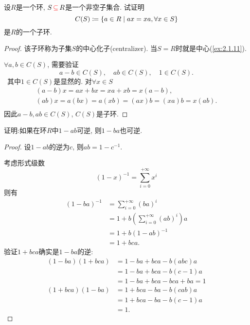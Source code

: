 \begin{problem}\label{ex:1.2.4}
    设$R$是一个环, $S \,\textcolor{red}{\subseteq}\, R$是一个非空子集合. 试证明
\[
    C(S) \mathrel{\coloneqq} \{a \in R \mid ax = xa, \forall x \in S \}
\]
是$R$的一个子环.
\end{problem}

\begin{proof}
    该子环称为子集$S$的中心化子(centralizer). 当$S = R$时就是中心(\ref{ex:2.1.11}).

    $\forall a, b \in C(S)$, 需要验证
    \[
        a - b \in C(S), \quad ab \in C(S), \quad 1 \in C(S).
    \]\
    其中$1 \in C(S)$是显然的.
    对$\forall x \in S$
    \[
    \begin{gathered}
        (a - b)x = ax + bx = xa + xb = x(a - b),\\
        (ab)x = a(bx) = a(xb) = (ax)b = (xa)b = x(ab).\\
    \end{gathered}
    \]
    因此$a - b, ab \in C(S)$, $C(S)$是子环.
\end{proof}

\begin{problem}\label{ex:1.2.5}
    证明:如果在环$R$中$1 - ab$可逆, 则$1 - ba$也可逆.
\end{problem}

\begin{proof}
    设$1 - ab$的逆为$c$, 则$ab = 1 - c^{-1}$.

    考虑形式级数
    \[
        (1 - x)^{-1} = \sum_{i = 0}^{+\infty} x^i
    \]
    则有
    \[
    \begin{aligned}
        (1 - ba)^{-1} &= \sum_{i = 0}^{+\infty} (ba)^i\\
        &= 1 + b\left(\sum_{i = 0}^{+\infty} (ab)^i\right)a\\
        &= 1 + b(1 - ab)^{-1}\\
        &= 1 + bca.
    \end{aligned} 
    \]
    验证$1 + bca$确实是$1 - ba$的逆: 
    \[
    \begin{aligned}
        (1 - ba)(1 + bca) &= 1 - ba + bca - b(abc)a\\
        &= 1 - ba + bca -b(c - 1)a\\
        &= 1 - ba + bca -bca + ba = 1\\
        (1 + bca)(1 - ba) &= 1 + bca - ba - b(cab)a\\
        &= 1 + bca - ba - b(c - 1)a\\
        &= 1.
    \end{aligned}
    \]
\end{proof}

